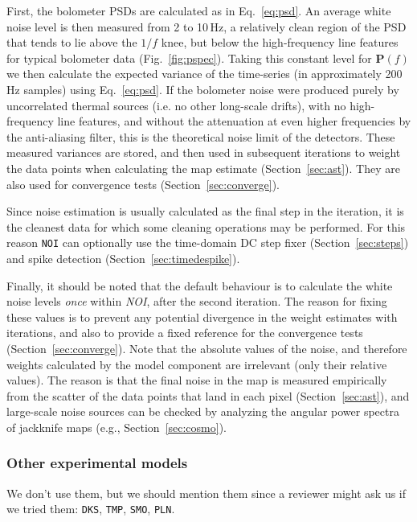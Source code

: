 \documentclass[useAMS,usenatbib,nofootinbib]{mn2e}
\newcommand{\model}[1]{\texttt{#1}}
\begin{document}
First, the bolometer PSDs are calculated as in Eq.~\ref{eq:psd}. An
average white noise level is then measured from 2 to 10\,Hz, a
relatively clean region of the PSD that tends to lie above the $1/f$
knee, but below the high-frequency line features for typical bolometer
data (Fig.~\ref{fig:pspec}). Taking this constant level for
$\mathbf{P}(f)$ we then calculate the expected variance of the
time-series (in approximately 200\,Hz samples) using
Eq.~\ref{eq:psd}. If the bolometer noise were produced purely by
uncorrelated thermal sources (i.e. no other long-scale drifts), with
no high-frequency line features, and without the attenuation at even
higher frequencies by the anti-aliasing filter, this is the
theoretical noise limit of the detectors. These measured variances are
stored, and then used in subsequent iterations to weight the data
points when calculating the map estimate (Section~\ref{sec:ast}). They
are also used for convergence tests (Section~\ref{sec:converge}).

Since noise estimation is usually calculated as the final step in the
iteration, it is the cleanest data for which some cleaning operations
may be performed. For this reason \model{NOI} can optionally use the
time-domain DC step fixer (Section~\ref{sec:steps}) and spike
detection (Section~\ref{sec:timedespike}).

Finally, it should be noted that the default behaviour is to calculate
the white noise levels \emph{once} within \emph{NOI}, after the second
iteration. The reason for fixing these values is to prevent any
potential divergence in the weight estimates with iterations, and also
to provide a fixed reference for the convergence tests
(Section~\ref{sec:converge}). Note that the absolute values of the
noise, and therefore weights calculated by the model component are
irrelevant (only their relative values). The reason is that the final
noise in the map is measured empirically from the scatter of the data
points that land in each pixel (Section~\ref{sec:ast}), and
large-scale noise sources can be checked by analyzing the angular
power spectra of jackknife maps (e.g., Section~\ref{sec:cosmo}).

\subsubsection{Other experimental models}

We don't use them, but we should mention them since a reviewer might
ask us if we tried them: \model{DKS}, \model{TMP}, \model{SMO},
\model{PLN}.
\end{document}
